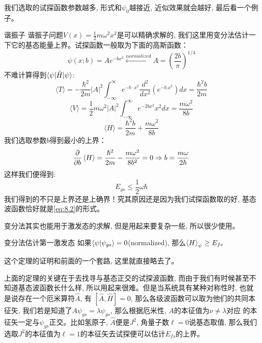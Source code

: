 \documentclass[a4paper,zihao=-4,linespread=1]{ctexrep}
\begin{document}
    我们选取的试探函数参数越多, 形式和$\psi_0$越接近, 近似效果就会越好, 最后看一个例子。
    \begin{example}{谐振子}
        谐振子问题$V(x)=\frac{1}{2}m\omega^2x^2$是可以精确求解的, 我们这里用变分法估计一下它的基态能量上界。试探函数一般取为下面的高斯函数：
        \begin{equation}
            \label{eq:8.2}
            \psi(x;b)=Ae^{-bx^2}\xleftarrow[]{normalized}A=\left(\frac{2b}{\pi}\right)^{1/4}
        \end{equation}
    不难计算得到$\braket{\psi|\hat{H}|\psi}$:
    \begin{equation*}
        \langle T\rangle=-\frac{\hbar^{2}}{2 m}|A|^{2} \int_{-\infty}^{\infty} e^{-b \cdot x^{2}} \frac{d^{2}}{d x^{2}}\left(e^{-b . x^{2}}\right) d x=\frac{\hbar^{2} b}{2 m}
    \end{equation*}
    \begin{equation*}
        \langle V\rangle=\frac{1}{2} m \omega^{2}|A|^{2} \int_{-\infty}^{\infty} e^{-2 b x^{2}} x^{2} d x=\frac{m \omega^{2}}{8 b}
    \end{equation*}
    \begin{equation*}
        \langle H\rangle=\frac{\hbar^{2} b}{2 m}+\frac{m \omega^{2}}{8 b}
    \end{equation*}
    我们选取参数$b$得到最小的上界：
    \begin{equation*}
        \frac{\partial}{\partial b}\braket{H}=\frac{\hbar^2}{2m}-\frac{m\omega^2}{8b^2}=0\Rightarrow b=\frac{m\omega}{2\hbar}
    \end{equation*}
    这样我们便得到:
    \begin{equation*}
        E_{gs}\leq\frac{1}{2}\omega\hbar
    \end{equation*}
    我们得到的不只是上界还是上确界！究其原因还是因为我们试探函数取的好, 基态波函数恰好就是\ref{eq:8.2}的形式。
    \end{example}

    变分法其实也能用于激发态的求解, 但是用起来要复杂一些, 所以很少使用。
    \begin{theorem}{变分法估计第一激发态}
        如果$\braket{\psi|\psi_{gs}}=0$(normalized), 那么$\braket{H}_\psi\geq E_{fe}$
    \end{theorem}
    
    这个定理的证明和前面的一个套路, 这里就直接略去了。
    
    上面的定理的关键在于去找寻与基态正交的试探波函数, 而由于我们有时候甚至不知道基态波函数长什么样, 所以用起来很难。但是当系统具有某种对称性时, 也就是说存在一个厄米算符$\hat{A}$, 有
    $\left[\hat{A},\hat{H}\right]=0$, 那么各级波函数可以取为他们的共同本征矢, 我们若是知道了$A\psi_{gs}=\lambda\psi_{gs}$, 那么根据厄米性, $A$的本征值为$\nu\neq\lambda$对应
    的本征矢一定与$\psi_{gs}$正交。比如氢原子, $\hat A$便是$J^2$, 角量子数$\ell=0$说基态取值, 那么我们选取$J^2$的本征值为$\ell=1$的本征矢去试探便可以估计$E_{fs}$的上界。
    
\end{document}
